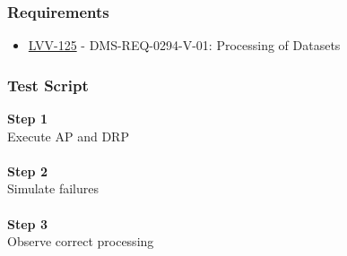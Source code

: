 \hypertarget{requirements-189}{%
\subsubsection{Requirements}\label{requirements-189}}

\begin{itemize}
\tightlist
\item
  \href{https://jira.lsstcorp.org/browse/LVV-125}{LVV-125} -
  DMS-REQ-0294-V-01: Processing of Datasets
\end{itemize}

\hypertarget{test-script-189}{%
\subsubsection{Test Script}\label{test-script-189}}

\textbf{Step 1}\\
Execute AP and DRP\\
~\\
\textbf{Step 2}\\
\hspace*{0.333em}Simulate failures\\
~\\
\textbf{Step 3}\\
Observe correct processing\\
~\\

